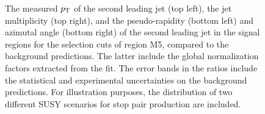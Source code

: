 \begin{figure}[!ht]
\begin{center}
{    }
  \end{center}
  \caption[Kinematic distributions of the $\pt$ of the second leading jet, the jet multiplicity, and the pseudo-rapidity and azimutal angle of the second leading jet in the signal regions for the selection cuts of region M5, after the normalization factors extracted from the fit have been applied.]
{The measured $\pt$ of the second leading jet (top left), the jet multiplicity (top right), and the pseudo-rapidity (bottom left) and azimutal angle (bottom right) of the second leading jet in the signal regions for the selection cuts of region M5, compared to the background predictions. The latter include the global normalization factors extracted from the fit. The error bands in the ratios include the statistical and experimental uncertainties on the background predictions. For illustration purposes, the distribution of two different SUSY scenarios for stop pair production are included.}
  \label{fig:Plot_M5_SR_Jet2}
\end{figure}


